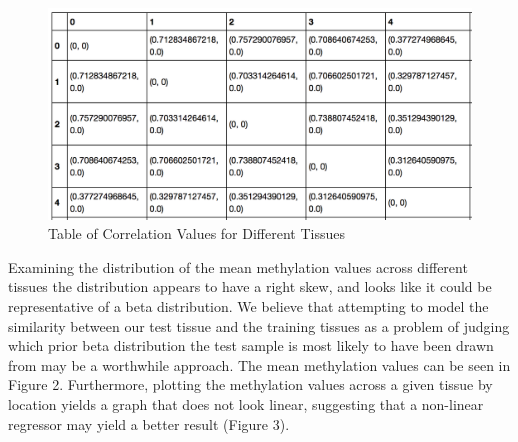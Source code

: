 \documentclass{article} %
\begin{document}
\begin{figure}[!ht]
\begin{center}
\caption{Table of Correlation Values for Different Tissues}
\begin{minipage}[b]{0.40\linewidth}
	\includegraphics[scale=0.3]{table1.png}
\end{minipage}
\end{center}
\end{figure}

Examining the distribution of the mean methylation values across different tissues the distribution appears to have a right skew, and looks like it could be representative of a beta distribution. We believe that attempting to model the similarity between our test tissue and the training tissues as a problem of judging which prior beta distribution the test sample is most likely to have been drawn from may be a worthwhile approach. The mean methylation values can be seen in Figure 2. Furthermore, plotting the methylation values across a given tissue by location yields a graph that does not look linear, suggesting that a non-linear regressor may yield a better result (Figure 3).
\end{document}
